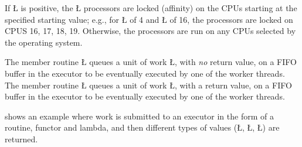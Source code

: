 \documentclass[openright,twoside]{report}
\begin{document}
\begin{prefix}
\begin{sloppypar}
If \LGinlinetrue\LGbegin\lgrinde\L{}\endlgrinde\LGend{} is positive, the \LGinlinetrue\LGbegin\lgrinde\L{}\endlgrinde\LGend{} processors are locked (affinity) on the CPUs starting at the specified starting value;
e.g., for \LGinlinetrue\LGbegin\lgrinde\L{}\endlgrinde\LGend{} of 4 and \LGinlinetrue\LGbegin\lgrinde\L{}\endlgrinde\LGend{} of 16, the processors are locked on CPUS 16, 17, 18, 19.
Otherwise, the processors are run on any CPUs selected by the operating system.
\end{sloppypar}
\end{prefix}

The member routine \LGinlinetrue\LGbegin\lgrinde\L{}\endlgrinde\LGend{} queues a unit of work \LGinlinetrue\LGbegin\lgrinde\L{}\endlgrinde\LGend{}, with \emph{no} return value, on a FIFO buffer in the executor to be eventually executed by one of the worker threads.
The member routine \LGinlinetrue\LGbegin\lgrinde\L{}\endlgrinde\LGend{} queues a unit of work \LGinlinetrue\LGbegin\lgrinde\L{}\endlgrinde\LGend{}, with a return value, on a FIFO buffer in the executor to be eventually executed by one of the worker threads.

 shows an example where work is submitted to an executor in the form of a routine, functor and lambda, and then different types of values (\LGinlinetrue\LGbegin\lgrinde\L{}\endlgrinde\LGend{}, \LGinlinetrue\LGbegin\lgrinde\L{}\endlgrinde\LGend{}, \LGinlinetrue\LGbegin\lgrinde\L{}\endlgrinde\LGend{}) are returned.
\end{document}
